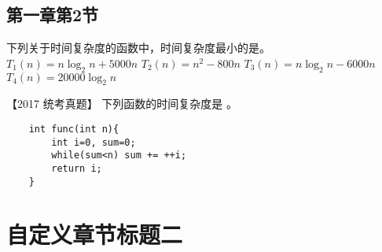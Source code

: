 \subsection{第一章第2节}

\begin{qitems}[r]

    \begin{bbox}
        \qitem   下列关于时间复杂度的函数中，时间复杂度最小的是\blankbox 。
        \fourchoices
        {$T_1(n)=n\log_2n +5000n$}
        {$T_2(n)=n^2 - 800n$}
        {$T_3(n)=n\log_2n - 6000n$}
        {$T_4(n)=20000\log_2n$}
    \end{bbox}

    \begin{bbox}
        \qitem   【2017 统考真题】 下列函数的时间复杂度是 \blankbox 。
        \begin{lstlisting}
    int func(int n){
        int i=0, sum=0;
        while(sum<n) sum += ++i;
        return i;
    }
        \end{lstlisting}
    \end{bbox}

\end{qitems}

\section{自定义章节标题二}
